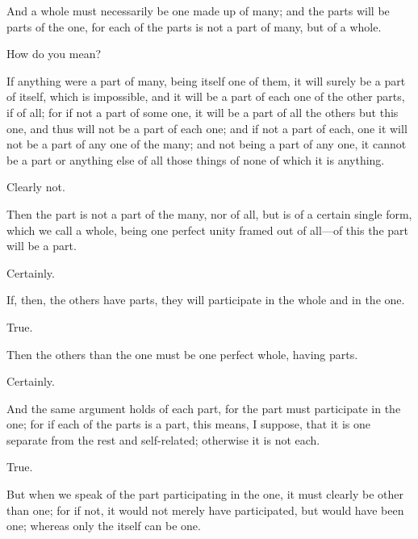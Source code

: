\documentclass[11pt,letter]{article}
\begin{document}
\par  And a whole must necessarily be one made up of many; and the parts will be parts of the one, for each of the parts is not a part of many, but of a whole.

\par  How do you mean?

\par  If anything were a part of many, being itself one of them, it will surely be a part of itself, which is impossible, and it will be a part of each one of the other parts, if of all; for if not a part of some one, it will be a part of all the others but this one, and thus will not be a part of each one; and if not a part of each, one it will not be a part of any one of the many; and not being a part of any one, it cannot be a part or anything else of all those things of none of which it is anything.

\par  Clearly not.

\par  Then the part is not a part of the many, nor of all, but is of a certain single form, which we call a whole, being one perfect unity framed out of all—of this the part will be a part.

\par  Certainly.

\par  If, then, the others have parts, they will participate in the whole and in the one.

\par  True.

\par  Then the others than the one must be one perfect whole, having parts.

\par  Certainly.

\par  And the same argument holds of each part, for the part must participate in the one; for if each of the parts is a part, this means, I suppose, that it is one separate from the rest and self-related; otherwise it is not each.

\par  True.

\par  But when we speak of the part participating in the one, it must clearly be other than one; for if not, it would not merely have participated, but would have been one; whereas only the itself can be one.
\end{document}
